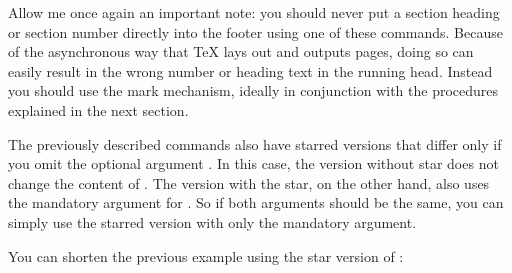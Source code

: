 Allow me once again an important note: you should never
put a section heading or section number directly into the footer using one of
these commands. Because of the asynchronous way that \TeX{} lays out and
outputs pages, doing so can easily result in the wrong number or heading text
in the running head. Instead you should use the mark mechanism, ideally in
conjunction with the procedures explained in the next section.%
\EndIndexGroup


\begin{Declaration}
\end{Declaration}
The previously described commands also have starred
versions that differ only if you
omit the optional argument . In this
case, the version without star does not change the content of
. The version with the star,
on the other hand, also uses the mandatory argument  for . So if both
arguments should be the same, you can simply use the starred version with only
the mandatory argument.%

\begin{Example}
  You can shorten the previous example using the star version of
  :
%
\end{Example}%
\EndIndexGroup


